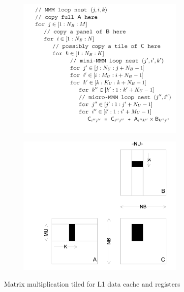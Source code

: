   \begin{figure}
  \centering
  \begin{subfigure}{1.0\linewidth}
    \centering
    \includegraphics[width=0.9\textwidth]{images/ATLAS_code.png}
    \caption{}
  \end{subfigure}
  \begin{subfigure}[t]{1.0\linewidth}
    \centering
    \includegraphics[width=0.9\textwidth]{images/ATLAS_pic.png}
    \caption{}
  \end{subfigure}
  \caption{Matrix multiplication tiled for L1 data cache and registers}
  \label{fig:design}
\end{figure}



